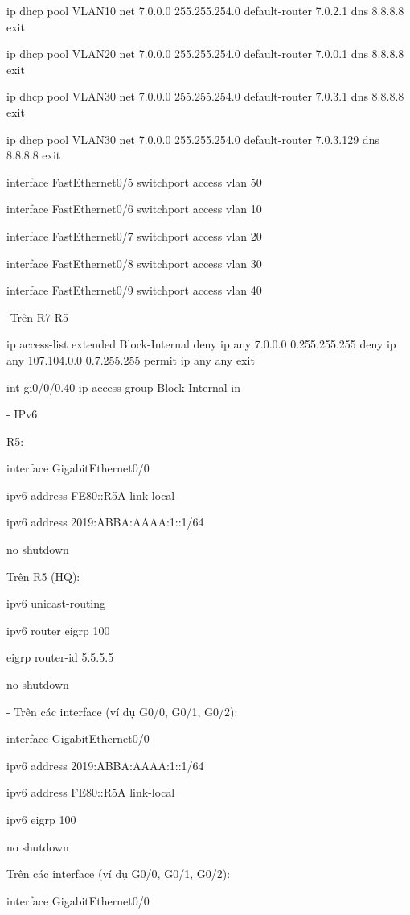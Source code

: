\documentclass[13pt]{article}
\begin{document}
ip dhcp pool VLAN10
net 7.0.0.0 255.255.254.0
default-router 7.0.2.1
dns 8.8.8.8
exit

ip dhcp pool VLAN20
net 7.0.0.0 255.255.254.0
default-router 7.0.0.1
dns 8.8.8.8
exit

ip dhcp pool VLAN30
net 7.0.0.0 255.255.254.0
default-router 7.0.3.1
dns 8.8.8.8
exit

ip dhcp pool VLAN30
net 7.0.0.0 255.255.254.0
default-router 7.0.3.129
dns 8.8.8.8
exit



interface FastEthernet0/5
 switchport access vlan 50

interface FastEthernet0/6
 switchport access vlan 10

interface FastEthernet0/7
 switchport access vlan 20

interface FastEthernet0/8
 switchport access vlan 30

interface FastEthernet0/9
 switchport access vlan 40


-Trên R7-R5

ip access-list extended Block-Internal
deny ip any 7.0.0.0 0.255.255.255
deny ip any 107.104.0.0 0.7.255.255
permit ip any any
exit

int gi0/0/0.40 
ip access-group Block-Internal in



- IPv6

R5:

interface GigabitEthernet0/0

 ipv6 address FE80::R5A link-local
 
 ipv6 address 2019:ABBA:AAAA:1::1/64
 
 no shutdown

Trên R5 (HQ):

ipv6 unicast-routing

ipv6 router eigrp 100

 eigrp router-id 5.5.5.5
 
 no shutdown
 
- Trên các interface (ví dụ G0/0, G0/1, G0/2):

interface GigabitEthernet0/0

 ipv6 address 2019:ABBA:AAAA:1::1/64
 
 ipv6 address FE80::R5A link-local
 
 ipv6 eigrp 100
 
 no shutdown

Trên các interface (ví dụ G0/0, G0/1, G0/2):

interface GigabitEthernet0/0
\end{document}
